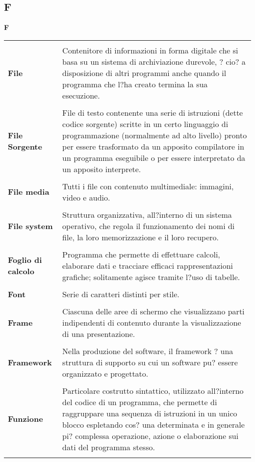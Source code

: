 {\subsection{F} 
\hfill\Huge{\textbf{F}} \\ 
\normalsize 
\begin{longtabu} to 
\toprule \\ 
\textbf{File} & Contenitore di informazioni in forma digitale che si basa su un sistema di archiviazione durevole, ? cio? a disposizione di altri programmi anche quando il programma che l?ha creato termina la sua esecuzione. \\ 
 \\ 
\textbf{File Sorgente} & File di testo contenente una serie di istruzioni (dette codice sorgente) scritte in un certo linguaggio di programmazione (normalmente ad alto livello) pronto per essere trasformato da un apposito compilatore in un programma eseguibile o per essere interpretato da un apposito interprete. \\ 
 \\ 
\textbf{File media} & Tutti i file con contenuto multimediale: immagini, video e audio. \\ 
 \\ 
\textbf{File system} & Struttura organizzativa, all?interno di un sistema operativo, che regola il funzionamento dei nomi di file, la loro memorizzazione e il loro recupero. \\ 
 \\ 
\textbf{Foglio di calcolo} & Programma che permette di effettuare calcoli, elaborare dati e tracciare efficaci rappresentazioni grafiche; solitamente agisce tramite l?uso di tabelle. \\ 
 \\ 
\textbf{Font} & Serie di caratteri distinti per stile. \\ 
 \\ 
\textbf{Frame} & Ciascuna delle aree di schermo che visualizzano parti indipendenti di contenuto durante la visualizzazione di una presentazione. \\ 
 \\ 
\textbf{Framework} & Nella produzione del software, il framework ? una struttura di supporto su cui un software pu? essere organizzato e progettato. \\ 
 \\ 
\textbf{Funzione} & Particolare costrutto sintattico, utilizzato all?interno del codice di un programma, che permette di raggruppare una sequenza di istruzioni in un unico blocco espletando cos? una determinata e in generale pi? complessa operazione, azione o elaborazione sui dati del programma stesso. \\ 
 \\ 
\end{longtabu} 
\newpage 
}
